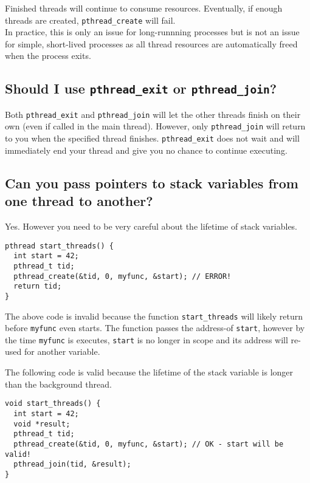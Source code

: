 Finished threads will continue to consume resources. Eventually, if
enough threads are created, \texttt{pthread\_create} will fail.\\In
practice, this is only an issue for long-runnning processes but is not
an issue for simple, short-lived processes as all thread resources are
automatically freed when the process exits.

\subsection{\texorpdfstring{Should I use \texttt{pthread\_exit} or
\texttt{pthread\_join}?}{Should I use pthread\_exit or pthread\_join?}}\label{should-i-use-pthreadux5fexit-or-pthreadux5fjoin}

Both \texttt{pthread\_exit} and \texttt{pthread\_join} will let the
other threads finish on their own (even if called in the main thread).
However, only \texttt{pthread\_join} will return to you when the
specified thread finishes. \texttt{pthread\_exit} does not wait and will
immediately end your thread and give you no chance to continue
executing.

\subsection{Can you pass pointers to stack variables from one thread to
another?}\label{can-you-pass-pointers-to-stack-variables-from-one-thread-to-another}

Yes. However you need to be very careful about the lifetime of stack
variables.

\begin{verbatim}
pthread start_threads() {
  int start = 42;
  pthread_t tid;
  pthread_create(&tid, 0, myfunc, &start); // ERROR!
  return tid;
}
\end{verbatim}

The above code is invalid because the function \texttt{start\_threads}
will likely return before \texttt{myfunc} even starts. The function
passes the address-of \texttt{start}, however by the time
\texttt{myfunc} is executes, \texttt{start} is no longer in scope and
its address will re-used for another variable.

The following code is valid because the lifetime of the stack variable
is longer than the background thread.

\begin{verbatim}
void start_threads() {
  int start = 42;
  void *result;
  pthread_t tid;
  pthread_create(&tid, 0, myfunc, &start); // OK - start will be valid!
  pthread_join(tid, &result);
}
\end{verbatim}

